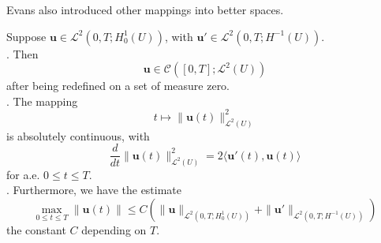 \documentclass{article}
\begin{document}
Evans also introduced other mappings into better spaces.

\begin{Th}
    Suppose $\textbf{u}\in \mathscr{L}^2(0,T;H_0^1(U))$, with $\textbf{u}'\in \mathscr{L}^2(0,T; H^{-1}(U))$. \\
    . Then 
    $$
    \textbf{u}\in\mathscr{C}([0,T]; \mathscr{L}^2(U))
    $$ after being redefined on a set of measure zero. \\
    . The mapping 
    $$
    t\mapsto \|\textbf{u}(t)\|_{\mathscr{L}^2(U)}^2
    $$ is absolutely continuous, with 
    $$
    \frac{d}{dt}\|\textbf{u}(t)\|^2_{\mathscr{L}^2(U)}=2\langle\textbf{u}'(t), \textbf{u}(t)\rangle
    $$ for a.e. $0\leq t\leq T$. \\
    . Furthermore, we have the estimate 
    $$
    \max_{0\leq t\leq T} \|\textbf{u}(t)\|\leq C\left(\|\textbf{u}\|_{\mathscr{L}^2(0,T; H_0^1(U))}+\|\textbf{u}'\|_{\mathscr{L}^2(0,T; H^{-1}(U))}\right)
    $$ the constant $C$ depending on $T$.
\end{Th}
\end{document}
